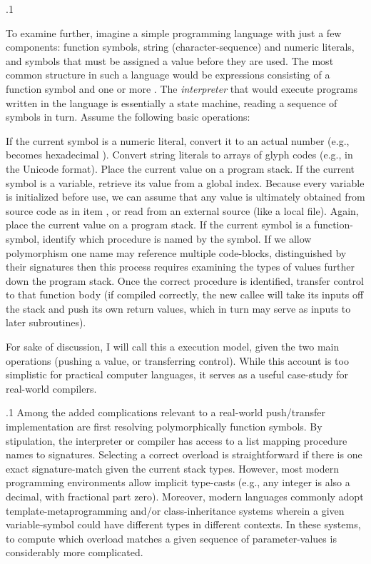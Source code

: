 \documentclass[11pt, twocolumn]{article}
\begin{document}
\p.1{%
\:\+To examine further, imagine a simple programming language with
just a few components: function symbols, string (character-sequence)
and numeric literals, and 
symbols that must be assigned a value before they are 
used. \> The most common structure in such a language would be expressions consisting of a function
symbol and one or more . \> The \textit{interpreter}
that would execute programs written in the language is essentially
a state machine, reading a sequence of symbols
in turn. \> Assume the following basic operations:\< \upAdj{4pt}

\begin{enums}

\enumsItem{}   \+If the current symbol is a numeric literal, convert it to an actual number
(e.g.,  becomes hexadecimal \OxFO{}). \> Convert
string literals to arrays of glyph
codes (e.g., in the Unicode \UTFonesix{} format). \> Place the current
value on a program stack.\< 
\enumsItem{}   \+If the current symbol is a variable, retrieve
its value from a global index. \> Because every
variable is initialized before use, we can assume that
any value is ultimately obtained from source code
as in item , or read from an external source 
(like a local file). \> Again, place the current 
value on a program stack.\< 
\enumsItem{}   \+If the current symbol is a function-symbol, identify
which procedure is named by the symbol. \> If we allow
polymorphism \mdash{} one name may reference multiple code-blocks,
distinguished by their signatures \mdash{} then this process
requires examining the types of values further down the
program stack. \> Once the correct procedure is identified,
transfer control to that function body (if compiled
correctly, the new callee will take its inputs off the
stack and push its own return values, which in turn
may serve as inputs to later subroutines).\<

\end{enums}

\nip{}%
\+For sake of discussion, I will call this a  execution
model, given the two main operations (pushing a value, or transferring
control). \> While this account is too simplistic for practical computer
languages, it serves
as a useful case-study for real-world compilers.\<\;
} %

\p.1{%
\:\+Among the added complications relevant to a real-world push/transfer
implementation are \mdash{} first \mdash{} resolving polymorphically
 function symbols. \> By stipulation, 
the interpreter or compiler
has access to a list mapping procedure names to 
signatures. \> Selecting a correct overload is 
straightforward if there is one exact
signature-match given the current stack types. \> However, most modern
programming environments allow implicit type-casts (e.g., any integer is also
a decimal, with fractional part zero). \> Moreover, modern languages commonly
adopt template-metaprogramming and/or class-inheritance systems wherein
a given variable-symbol could have different types in different
contexts. \> In these systems, to compute which overload matches a
given sequence of parameter-values is considerably more complicated.\<\;
} %
\end{document}
